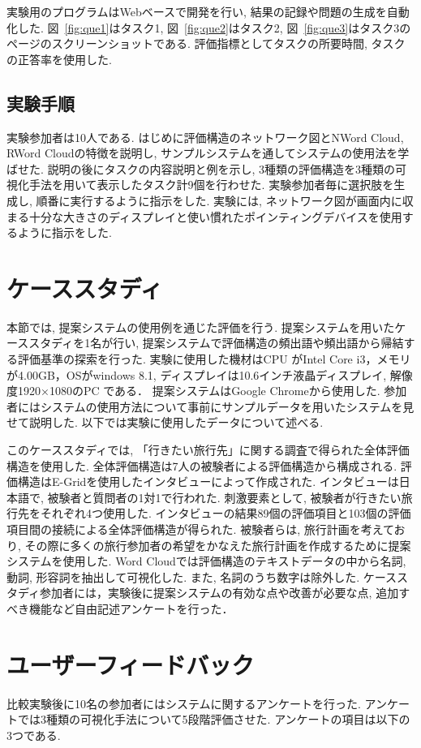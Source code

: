\documentclass[syuuron]{kuee}
\begin{document}
			実験用のプログラムはWebベースで開発を行い, 結果の記録や問題の生成を自動化した. 
			図~\ref{fig:que1}はタスク1, 図~\ref{fig:que2}はタスク2, 
			図~\ref{fig:que3}はタスク3のページのスクリーンショットである. 
			評価指標としてタスクの所要時間, タスクの正答率を使用した. 
		
		\subsection{実験手順}
			実験参加者は10人である. 
			はじめに評価構造のネットワーク図とNWord Cloud, RWord Cloudの特徴を説明し, 
			サンプルシステムを通してシステムの使用法を学ばせた. 
			説明の後にタスクの内容説明と例を示し, 3種類の評価構造を3種類の可視化手法を用いて表示したタスク計9個を行わせた. 
			実験参加者毎に選択肢を生成し, 順番に実行するように指示をした. 
			実験には, ネットワーク図が画面内に収まる十分な大きさのディスプレイと使い慣れたポインティングデバイスを使用するように指示をした. 
		
	\section{ケーススタディ}
		本節では, 提案システムの使用例を通じた評価を行う. 
		提案システムを用いたケーススタディを1名が行い, 提案システムで評価構造の頻出語や頻出語から帰結する評価基準の探索を行った. 
		実験に使用した機材はCPU がIntel Core i3，メモリが4.00GB，OSがwindows 8.1, ディスプレイは10.6インチ液晶ディスプレイ, 解像度1920×1080のPC である．
		提案システムはGoogle Chromeから使用した. 
		参加者にはシステムの使用方法について事前にサンプルデータを用いたシステムを見せて説明した. 以下では実験に使用したデータについて述べる. 
		
		このケーススタディでは, 「行きたい旅行先」に関する調査で得られた全体評価構造を使用した. 
		全体評価構造は7人の被験者による評価構造から構成される. 
		評価構造はE-Gridを使用したインタビューによって作成された. 
		インタビューは日本語で, 被験者と質問者の1対1で行われた. 
		刺激要素として, 被験者が行きたい旅行先をそれぞれ4つ使用した. 
		インタビューの結果89個の評価項目と103個の評価項目間の接続による全体評価構造が得られた. 
		被験者らは, 旅行計画を考えており, その際に多くの旅行参加者の希望をかなえた旅行計画を作成するために提案システムを使用した. 
		Word Cloudでは評価構造のテキストデータの中から名詞, 動詞, 形容詞を抽出して可視化した. 
		また, 名詞のうち数字は除外した. 
		ケーススタディ参加者には，実験後に提案システムの有効な点や改善が必要な点, 追加すべき機能など自由記述アンケートを行った．
		
	\section{ユーザーフィードバック}
		比較実験後に10名の参加者にはシステムに関するアンケートを行った. 
		アンケートでは3種類の可視化手法について5段階評価させた. 
		アンケートの項目は以下の3つである. 
		
\end{document}
